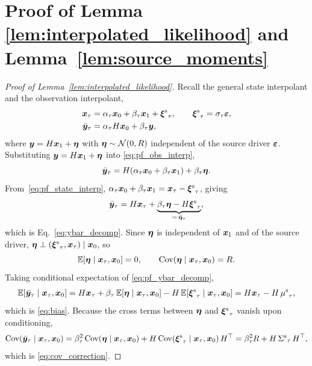 \section{Proof of Lemma \ref{lem:interpolated_likelihood} and Lemma~\ref{lem:source_moments}} \label{appendix:proof_interpolant_likelihood}

\begin{proof}[Proof of Lemma~\ref{lem:interpolated_likelihood}]
Recall the general state interpolant and the observation interpolant,
\begin{align}
  \boldsymbol{x}_\tau &= \alpha_\tau \boldsymbol{x}_0 + \beta_\tau \boldsymbol{x}_1 + {\bm{\xi}^{\mathrm{s}}}_\tau,
     \qquad {\bm{\xi}^{\mathrm{s}}}_\tau = \sigma_\tau\bm{\varepsilon}, \label{eq:pf_state_interp}\\
  \bar{\boldsymbol{y}}_\tau &= \alpha_\tau H\boldsymbol{x}_0 + \beta_\tau \boldsymbol{y}, \label{eq:pf_obs_interp}
\end{align}
where $\boldsymbol{y} = H\boldsymbol{x}_1 + \boldsymbol{\eta}$ with $\boldsymbol{\eta} \sim \mathcal{N}(0,R)$ independent of the source driver $\bm{\varepsilon}$. Substituting $\boldsymbol{y} = H\boldsymbol{x}_1 + \boldsymbol{\eta}$ into \eqref{eq:pf_obs_interp},
\begin{equation}
  \bar{\boldsymbol{y}}_\tau
  = H(\alpha_\tau\boldsymbol{x}_0 + \beta_\tau\boldsymbol{x}_1) + \beta_\tau\boldsymbol{\eta} .
\end{equation}
From~\eqref{eq:pf_state_interp}, $\alpha_\tau\boldsymbol{x}_0 + \beta_\tau\boldsymbol{x}_1 = \boldsymbol{x}_\tau - {\bm{\xi}^{\mathrm{s}}}_\tau$, giving
\begin{equation}\label{eq:pf_ybar_decomp}
  \bar{\boldsymbol{y}}_\tau
  = H\boldsymbol{x}_\tau
    + \underbrace{\beta_\tau\boldsymbol{\eta} - H{\bm{\xi}^{\mathrm{s}}}_\tau}_{=\,\bar{\boldsymbol{\eta}}_\tau},
\end{equation}
which is Eq.~\eqref{eq:ybar_decomp}. Since $\boldsymbol{\eta}$ is independent of $\boldsymbol{x}_1$ and of the source driver, $\boldsymbol{\eta} \perp ({\bm{\xi}^{\mathrm{s}}}_\tau, \boldsymbol{x}_\tau) \mid \boldsymbol{x}_0$, so
\begin{equation}
  \mathbb{E}[\boldsymbol{\eta} \mid \boldsymbol{x}_\tau, \boldsymbol{x}_0] = 0,
  \qquad
  \text{Cov}(\boldsymbol{\eta} \mid \boldsymbol{x}_\tau, \boldsymbol{x}_0) = R .
\end{equation}
Taking conditional expectation of \eqref{eq:pf_ybar_decomp},
\begin{align}
  \mathbb{E}[\bar{\boldsymbol{y}}_\tau \mid \boldsymbol{x}_\tau, \boldsymbol{x}_0]
  = H\boldsymbol{x}_\tau + \beta_\tau\,\mathbb{E}[\boldsymbol{\eta} \mid \boldsymbol{x}_\tau, \boldsymbol{x}_0]
    - H\,\mathbb{E}[{\bm{\xi}^{\mathrm{s}}}_\tau \mid \boldsymbol{x}_\tau, \boldsymbol{x}_0]
  = H\boldsymbol{x}_\tau - H\,{\mu^{\mathrm{s}}}_\tau,
\end{align}
which is \eqref{eq:bias}. Because the cross terms between $\boldsymbol{\eta}$ and ${\bm{\xi}^{\mathrm{s}}}_\tau$ vanish upon conditioning,
\begin{align}
  \text{Cov}(\bar{\boldsymbol{y}}_\tau \mid \boldsymbol{x}_\tau, \boldsymbol{x}_0)
  = \beta_\tau^2\,\text{Cov}(\boldsymbol{\eta} \mid \boldsymbol{x}_\tau, \boldsymbol{x}_0)
    + H\,\text{Cov}({\bm{\xi}^{\mathrm{s}}}_\tau \mid \boldsymbol{x}_\tau, \boldsymbol{x}_0)\,H^\top
  = \beta_\tau^2R + H\,{\Sigma^{\mathrm{s}}}_\tau\,H^\top,
\end{align}
which is \eqref{eq:cov_correction}.
\end{proof}

